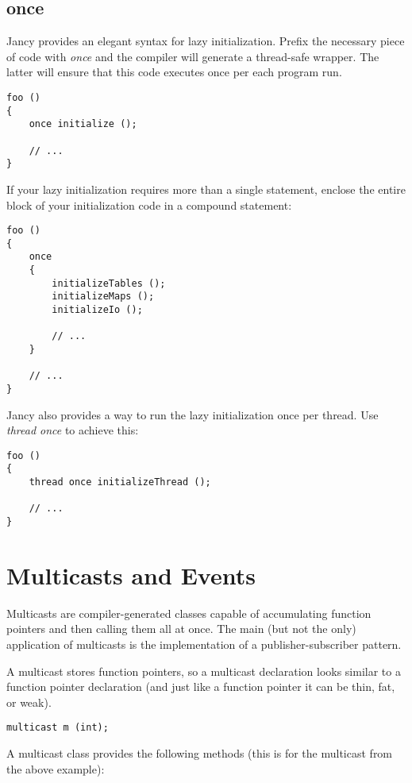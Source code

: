 \documentclass[oneside]{book}
\begin{document}
\subsection{once}
Jancy provides an elegant syntax for lazy initialization. Prefix the necessary piece of code with \emph{once} and the compiler will generate a thread-safe wrapper. The latter will ensure that this code executes once per each program run.

\begin{lstlisting}
foo ()
{
    once initialize ();

    // ...
}
\end{lstlisting}

If your lazy initialization requires more than a single statement, enclose the entire block of your initialization code in a compound statement:

\begin{lstlisting}
foo ()
{
    once 
    {
        initializeTables ();
        initializeMaps ();
        initializeIo ();

        // ...
    }

    // ...
}
\end{lstlisting}

Jancy also provides a way to run the lazy initialization once per thread. Use \emph{thread once} to achieve this:

\begin{lstlisting}
foo ()
{
    thread once initializeThread (); 

    // ...
}
\end{lstlisting}

\section{Multicasts and Events}
Multicasts are compiler-generated classes capable of accumulating function pointers and then calling them all at once. The main (but not the only) application of multicasts is the implementation of a publisher-subscriber pattern.

A multicast stores function pointers, so a multicast declaration looks similar to a function pointer declaration (and just like a function pointer it can be thin, fat, or weak).

\begin{lstlisting}
multicast m (int);
\end{lstlisting}

A multicast class provides the following methods (this is for the multicast from the above example):
\end{document}
